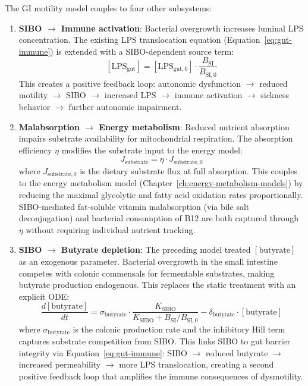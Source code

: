 The GI motility model couples to four other subsystems:

\begin{enumerate}
    \item \textbf{SIBO $\to$ Immune activation}: Bacterial overgrowth increases luminal LPS concentration. The existing LPS translocation equation (Equation~\ref{eq:gut-immune}) is extended with a SIBO-dependent source term:
    \begin{equation}
    \label{eq:lps-sibo}
    [\text{LPS}_{\text{gut}}] = [\text{LPS}_{\text{gut},0}] \cdot \frac{B_{\text{SI}}}{B_{\text{SI},0}}
    \end{equation}
    This creates a positive feedback loop: autonomic dysfunction $\to$ reduced motility $\to$ SIBO $\to$ increased LPS $\to$ immune activation $\to$ sickness behavior $\to$ further autonomic impairment.

    \item \textbf{Malabsorption $\to$ Energy metabolism}: Reduced nutrient absorption impairs substrate availability for mitochondrial respiration. The absorption efficiency $\eta$ modifies the substrate input to the energy model:
    \begin{equation}
    \label{eq:malabsorption-energy}
    J_{\text{substrate}} = \eta \cdot J_{\text{substrate},0}
    \end{equation}
    where $J_{\text{substrate},0}$ is the dietary substrate flux at full absorption. This couples to the energy metabolism model (Chapter~\ref{ch:energy-metabolism-models}) by reducing the maximal glycolytic and fatty acid oxidation rates proportionally. SIBO-mediated fat-soluble vitamin malabsorption (via bile salt deconjugation) and bacterial consumption of B12 are both captured through $\eta$ without requiring individual nutrient tracking.

    \item \textbf{SIBO $\to$ Butyrate depletion}: The preceding model treated $[\text{butyrate}]$ as an exogenous parameter. Bacterial overgrowth in the small intestine competes with colonic commensals for fermentable substrates, making butyrate production endogenous. This replaces the static treatment with an explicit ODE:
    \begin{equation}
    \label{eq:sibo-butyrate}
    \frac{d[\text{butyrate}]}{dt} = \sigma_{\text{butyrate}} \cdot \frac{K_{\text{SIBO}}}{K_{\text{SIBO}} + B_{\text{SI}}/B_{\text{SI},0}} - \delta_{\text{butyrate}} \cdot [\text{butyrate}]
    \end{equation}
    where $\sigma_{\text{butyrate}}$ is the colonic production rate and the inhibitory Hill term captures substrate competition from SIBO. This links SIBO to gut barrier integrity via Equation~\ref{eq:gut-immune}: SIBO $\to$ reduced butyrate $\to$ increased permeability $\to$ more LPS translocation, creating a second positive feedback loop that amplifies the immune consequences of dysmotility.


\end{enumerate}
